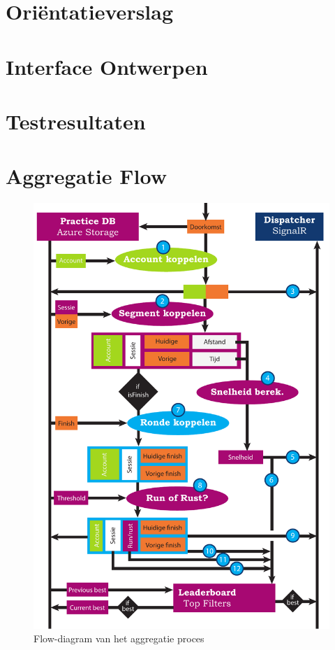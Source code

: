 \documentclass[dutch]{style/tudelft-report}
\begin{document}

\chapter{Oriëntatieverslag} \label{ch:orientatieverslag} 

\chapter{Interface Ontwerpen} \label{ch:interface-ontwerpen} 

\chapter{Testresultaten} \label{ch:testplan}
    

\chapter{Aggregatie Flow} \label{ch:aggregation-flow}

\begin{figure}[ht]
  \begin{center}
    \includegraphics[width=\textwidth]{style/images/Aggregatie-flow}
  \end{center}
  \caption{Flow-diagram van het aggregatie proces}
  \label{fig:aggregatie-flow-large}
\end{figure}


\end{document}
